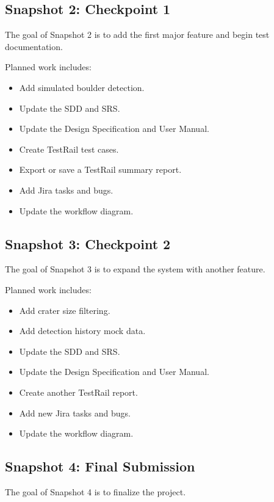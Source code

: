 \documentclass[12pt]{article}
\begin{document}
\subsection{Snapshot 2: Checkpoint 1}

The goal of Snapshot 2 is to add the first major feature and begin test documentation.

Planned work includes:

\begin{itemize}
    \item Add simulated boulder detection.
    \item Update the SDD and SRS.
    \item Update the Design Specification and User Manual.
    \item Create TestRail test cases.
    \item Export or save a TestRail summary report.
    \item Add Jira tasks and bugs.
    \item Update the workflow diagram.
\end{itemize}

\subsection{Snapshot 3: Checkpoint 2}

The goal of Snapshot 3 is to expand the system with another feature.

Planned work includes:

\begin{itemize}
    \item Add crater size filtering.
    \item Add detection history mock data.
    \item Update the SDD and SRS.
    \item Update the Design Specification and User Manual.
    \item Create another TestRail report.
    \item Add new Jira tasks and bugs.
    \item Update the workflow diagram.
\end{itemize}

\subsection{Snapshot 4: Final Submission}

The goal of Snapshot 4 is to finalize the project.
\end{document}
